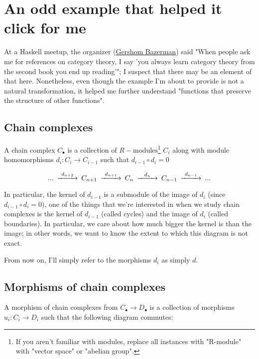 \documentclass[11pt]{article}
\begin{document}
\section*{An odd example that helped it click for me}
\label{sec:org084df3b}
At a Haskell meetup, the organizer (\href{https://gbaz.github.io/}{Gershom Bazerman}) said "When people ask me for references on category theory, I say 'you always learn category theory from the second book you end up reading'";
I suspect that there may be an element of that here. Nonetheless, even though the example I'm about to provide is not a natural transformation, it helped me further understand
"functions that preserve the structure of other functions".


\subsection*{Chain complexes}
\label{sec:orgccc178d}

A chain complex \(C_\bullet\) is a collection of \(R-\text{modules}\)\footnote{If you aren't familiar with modules, replace all instances with "R-module" with "vector space" or "abelian group".} \(C_i\) along with module homomorphisms \(d_i: C_i\to C_{i-1}\) such that \(d_{i-1}\circ d_{i} = 0\)

\[\begin{CD}
... @>d_{n+2}>> C_{n+1} @>d_{n+1}>> C_n @>d_n>> C_{n-1} @>d_{n-1}>> ...\\
\end{CD}\]

In particular, the kernel of \(d_{i-1}\) is a submodule of the image of \(d_i\) (since \(d_{i-1}\circ d_{i} = 0\)), one of the things that we're interested in when we study chain complexes
 is the kernel of \(d_{i-1}\) (called cycles) and the image of \(d_i\) (called boundaries). In particular, we care about how much bigger the kernel is than the image; in other words,
we want to know the extent to which this diagram is not exact.

From now on, I'll simply refer to the morphisms \(d_i\) as simply \(d\).
\subsection*{Morphisms of chain complexes}
\label{sec:org2c187f7}

A morphism of chain complexes from \(C_\bullet \to D_\bullet\) is a collection of morphisms \(u_i: C_i\to D_i\) such that the following diagram commutes:
\end{document}
